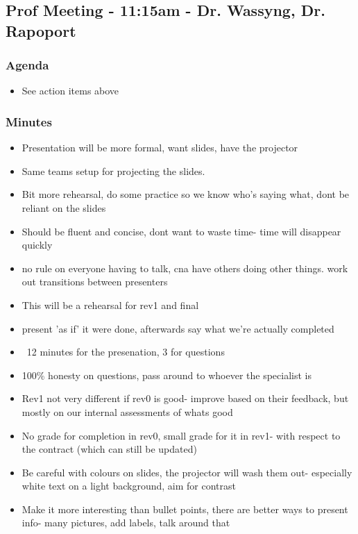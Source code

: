 	\subsection*{Prof Meeting - 11:15am - Dr. Wassyng, Dr. Rapoport}
		\subsubsection*{Agenda}
			\begin{itemize}
				\item See action items above
			\end{itemize}

		\subsubsection*{Minutes}
			\begin{itemize}
				\item Presentation will be more formal, want slides, have the projector
				\item Same teams setup for projecting the slides.
				\item Bit more rehearsal, do some practice so we know who's saying what, dont be reliant on the slides
				\item Should be fluent and concise, dont want to waste time- time will disappear quickly
				\item no rule on everyone having to talk, cna have others doing other things. work out transitions between presenters
				\item This will be a rehearsal for rev1 and final
				\item present 'as if' it were done, afterwards say what we're actually completed
				\item ~12 minutes for the presenation, 3 for questions
				\item 100\% honesty on questions, pass around to whoever the specialist is 
				\item Rev1 not very different if rev0 is good- improve based on their feedback, but mostly on our internal assessments of whats good 
				\item No grade for completion in rev0, small grade for it in rev1- with respect to the contract (which can still be updated)
				\item Be careful with colours on slides, the projector will wash them out- especially white text on a light background, aim for contrast
				\item Make it more interesting than bullet points, there are better ways to present info- many pictures, add labels, talk around that

\end{itemize}
